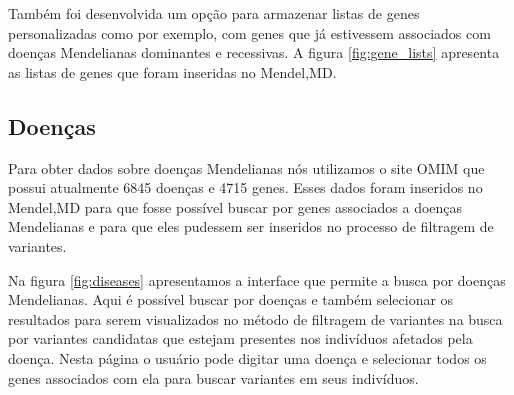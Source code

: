 Também foi desenvolvida um opção para armazenar listas de genes personalizadas como por exemplo, com genes que já estivessem associados com doenças Mendelianas dominantes e recessivas. A figura \ref{fig:gene_lists} apresenta as listas de genes que foram inseridas no Mendel,MD.


\subsection{Doenças}

Para obter dados sobre doenças Mendelianas nós utilizamos o site OMIM que possui atualmente 6845 doenças e 4715 genes. Esses dados foram inseridos no Mendel,MD para que fosse possível buscar por genes associados a doenças Mendelianas e para que eles pudessem ser inseridos no processo de filtragem de variantes.

Na figura \ref{fig:diseases} apresentamos a interface que permite a busca por doenças Mendelianas. Aqui é possível buscar por doenças e também selecionar os resultados para serem visualizados no método de filtragem de variantes na busca por variantes candidatas que estejam presentes nos indivíduos afetados pela doença. Nesta página o usuário pode digitar uma doença e selecionar todos os genes associados com ela para buscar variantes em seus indivíduos.

